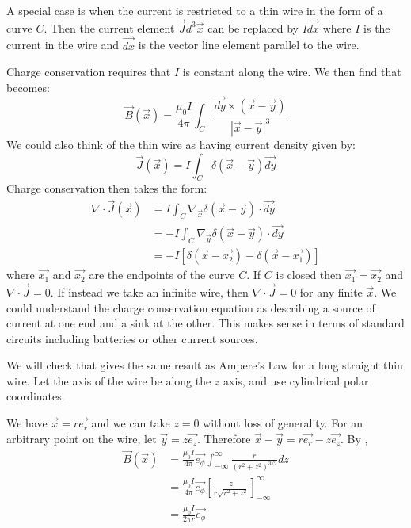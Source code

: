 \documentclass[../Main.tex]{subfiles}
\begin{document}
A special case is when the current is restricted to a thin wire in the form of a curve $C$. Then the current element $\vec{J} d^3\vec{x}$ can be replaced by $I \vec{dx}$ where $I$ is the current in the wire and $\vec{dx}$ is the vector line element parallel to the wire.

Charge conservation requires that $I$ is constant along the wire. We then find that  becomes:
\begin{equation}
    \vec{B}(\vec{x}) = \frac{\mu_0I}{4\pi} \int_C \frac{\vec{dy} \times (\vec{x} - \vec{y})}{|\vec{x} - \vec{y}|^3}
    \label{eqnBiotSavartWire}
\end{equation}
We could also think of the thin wire as having current density given by:
\begin{equation*}
    \vec{J}(\vec{x}) = I \int_C \delta(\vec{x} - \vec{y}) \vec{dy}
\end{equation*}
Charge conservation then takes the form:
\begin{align*}
    \nabla \cdot \vec{J}(\vec{x}) &= I\int_C \nabla_{\vec{x}}\delta(\vec{x} - \vec{y}) \cdot \vec{dy} \\
    &= - I \int_C \nabla_{\vec{y}} \delta(\vec{x} - \vec{y}) \cdot \vec{dy} \\
    &= -I\left[\delta(\vec{x} - \vec{x_2}) - \delta(\vec{x} - \vec{x_1})\right]
\end{align*}
where $\vec{x_1}$ and $\vec{x_2}$ are the endpoints of the curve $C$. If $C$ is closed then $\vec{x_1} = \vec{x_2}$ and $\nabla \cdot \vec{J} = 0$. If instead we take an infinite wire, then $\nabla \cdot \vec{J} = 0$ for any finite $\vec{x}$. We could understand the charge conservation equation as describing a source of current at one end and a sink at the other. This makes sense in terms of standard circuits including batteries or other current sources.

We will check that  gives the same result as Ampere's Law for a long straight thin wire. Let the axis of the wire be along the $z$ axis, and use cylindrical polar coordinates.

We have $\vec{x} = r\vec{e_r}$ and we can take $z = 0$ without loss of generality. For an arbitrary point on the wire, let $\vec{y} = z \vec{e_z}$. Therefore $\vec{x} - \vec{y} = r\vec{e_r} - z\vec{e_z}$. By ,
\begin{align*}
    \vec{B}(\vec{x}) &= \frac{\mu_0 I}{4\pi} \vec{e_\phi} \int_{-\infty}^{\infty} \frac{r}{(r^2 + z^2)^{3 / 2}} dz \\
    &= \frac{\mu_0 I}{4\pi} \vec{e_{\phi}} \left[\frac{z}{r\sqrt{r^2 + z^2}}\right]_{-\infty}^\infty \\
    &= \frac{\mu_0 I}{2\pi r} \vec{e_\phi}
\end{align*}
\end{document}
